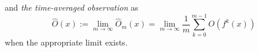 \documentclass[format=acmsmall, authorversion, screen=true]{acmart}
\def\R{\ensuremath{\mathbb{R}}}
\begin{document}
and \emph{the time-averaged observation} as
\[
\hat{O}(x) := \lim_{m \rightarrow \infty} \hat{O}_m(x) =
\lim_{m \rightarrow \infty} \frac{1}{m} \sum_{k=0}^{m-1} O(f^{k}(x))
\]
when the appropriate limit exists.

\end{document}
